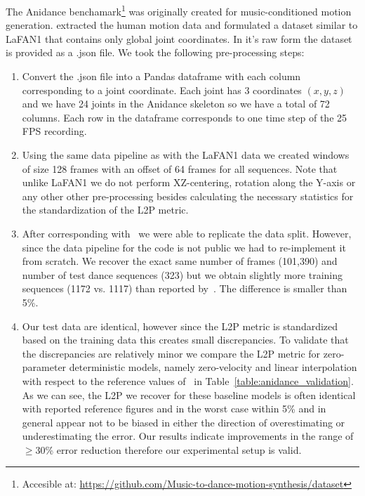 \documentclass[letterpaper]{article} \usepackage[]{aaai23}  \usepackage{times}  \usepackage{helvet}  \usepackage{courier}  \usepackage[hyphens]{url}  \usepackage{graphicx} \urlstyle{rm} \def\UrlFont{\rm}  \usepackage{natbib}  \usepackage{caption} \frenchspacing  \setlength{\pdfpagewidth}{8.5in} \setlength{\pdfpageheight}{11in}
\begin{document}
The Anidance benchamark\footnote{Accesible at: \url{https://github.com/Music-to-dance-motion-synthesis/dataset}} was originally created for music-conditioned motion generation. \citet{duan2021singleshot} extracted the human motion data and formulated a dataset similar to LaFAN1 that contains only global joint coordinates.
In it's raw form the dataset is provided as a .json file. We took the following pre-processing steps:
\begin{enumerate}
    \item Convert the .json file into a Pandas dataframe with each column corresponding to a joint coordinate. Each joint has 3 coordinates $(x,y,z)$ and we have 24 joints in the Anidance skeleton so we have a total of 72 columns. Each row in the dataframe corresponds to one time step of the 25 FPS recording.
    \item Using the same data pipeline as with the LaFAN1 data we created windows of size 128 frames with an offset of 64 frames for all sequences. Note that unlike LaFAN1 we do not perform XZ-centering, rotation along the Y-axis or any other other pre-processing besides calculating the necessary statistics for the standardization of the L2P metric.
    \item After corresponding with~\citet{duan2021singleshot} we were able to replicate the data split. However, since the data pipeline for the code is not public we had to re-implement it from scratch. We recover the exact same number of frames (101,390) and number of test dance sequences (323) but we obtain slightly more training sequences (1172 vs. 1117) than reported by~\citet{duan2021singleshot}. The difference is smaller than 5\%.
    \item Our test data are identical, however since the L2P metric is standardized based on the training data this creates small discrepancies. To validate that the discrepancies are relatively minor we compare the L2P metric for zero-parameter deterministic models, namely zero-velocity and linear interpolation with respect to the reference values of~\citet{duan2021singleshot} in Table~\ref{table:anidance_validation}. As we can see, the L2P we recover for these baseline models is often identical with reported reference figures and in the worst case within 5\% and in general appear not to be biased in either the direction of overestimating or underestimating the error. Our results indicate improvements in the range of $\ge$30\% error reduction therefore our experimental setup is valid.
\end{enumerate}
\end{document}
